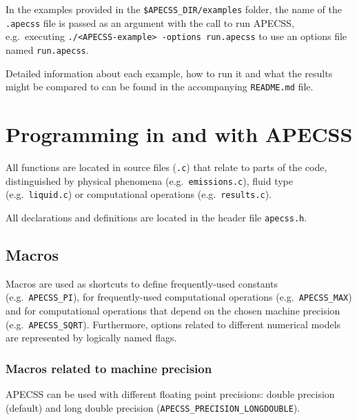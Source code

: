 In the examples provided in the {\tt \$APECSS\_DIR/examples} folder, the name of the  {\tt *.apecss} file is passed as an argument with the call to run APECSS, e.g.~executing {\tt ./<APECSS-example> -options run.apecss} to use an options file named {\tt run.apecss}.

Detailed information about each example, how to run it and what the results might be compared to can be found in the accompanying {\tt README.md} file.

\section{Programming in and with APECSS}

All functions are located in source files ({\tt *.c}) that relate to parts of the code, distinguished by physical phenomena (e.g.~{\tt emissions.c}), fluid type (e.g.~{\tt liquid.c}) or computational operations (e.g.~{\tt results.c}). 

All declarations and definitions are located in the header file {\tt apecss.h}. 

\subsection{Macros}

Macros are used as shortcuts to define frequently-used constants (e.g.~{\tt APECSS\_PI}), for frequently-used computational operations (e.g.~{\tt APECSS\_MAX}) and for computational operations that depend on the chosen machine precision (e.g.~{\tt APECSS\_SQRT}). Furthermore, options related to different numerical models are represented by logically named flags.

\subsubsection{Macros related to machine precision}

APECSS can be used with different floating point precisions: double precision (default) and long double precision ({\tt APECSS\_PRECISION\_LONGDOUBLE}).

